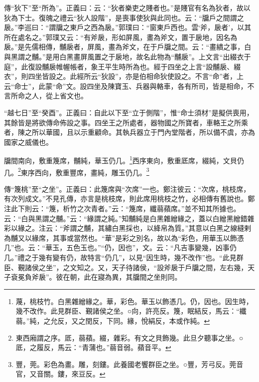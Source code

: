 {\noindent\zhuan{}\fzbyks 傳“狄下”至“所為”。正義曰：云：“狄者樂吏之賤者也。”是賤官有名為狄者，故以狄為下士。復魄之禮云“狄人設階”，是喪事使狄與此同也。云：“牖戶之間謂之扆。”李巡曰：“謂牖之東戶之西為扆。”郭璞曰：“窗東戶西也。雲‘斧，扆者’，以其所在處名之。”郭璞又云：“有斧扆，形如屏風，畫為斧文，置于扆地，因名為扆。”是先儒相傳，黼扆者，屏風，畫為斧文，在于戶牖之間。云：“畫繢之事，白與黑謂之黼。”是用白黑畫屏風置之于扆地，故名此物為“黼扆”。上文言“出綴衣于庭”，此復設黼扆帷幄帳者，象王平生時所為也。經于四坐之上言“設黼扆、綴衣”，則四坐皆設之。此經所云“狄設”，亦是伯相命狄使設之。不言“命”者，上云“命士”，此蒙“命”文。設四坐及陳寶玉、兵器與輅車，各有所司，皆是相命，不言所命之人，從上省文也。 \par}

{\noindent\shu{}\fzkt “越七日”至“癸酉”。正義曰：自此以下至“立于側階”，惟“命士須材”是擬供喪用，其餘皆是將欲傳命佈設之事。四坐王之所處者，器物國之所寶者，車輅王之所乘者，陳之所以華國，且以示重顧命。其執兵器立于門內堂階者，所以備不虞，亦為國家之威儀也。 \par}

牖間南向，敷重篾席，黼純，華玉仍几。\footnote{蔑，桃枝竹。白黑雜繒緣之。華，彩色。華玉以飾憑几。仍，因也。因生時，幾不改作。此見群臣、覲諸侯之坐。○向，許亮反。篾，眠結反，馬云：“纖蒻。”純，之允反，又之閏反，下同。緣，悅絹反，本或作純。}西序東向，敷重厎席，綴純，文貝仍几。\footnote{東西廂謂之序。厎，蒻蘋。綴，雜彩。有文之貝飾幾。此旦夕聽事之坐。○厎，之履反，馬云：“青蒲也。”蒻音弱。蘋音平。}東序西向，敷重豐席，畫純，雕玉仍几。\footnote{豐，莞。彩色為畫。雕，刻鏤。此養國老饗群臣之坐。○豐，芳弓反。莞音官，又音關。鏤，來豆反。}


{\noindent\zhuan{}\fzbyks 傳“篾桃”至“之坐”。正義曰：此篾席與“次席”一也。鄭注彼云：“次席，桃枝席，有次列成文。”不見孔傳，亦言是桃枝席，則此席用桃枝之竹，必相傳有舊說也。鄭注此下則云：“篾，析竹之次青者。”云：“篾席，纖蒻蘋席。”並不知其所據也。云：“白與黑謂之黼。”云：“緣謂之純。”知黼純是白黑雜繒緣之，蓋以白繒黑繒錯雜彩以緣之。注云：“斧謂之黼，其繡白黑採也，以絳帛為質。”其意以白黑之線縫剌為黼又以緣席，其事或當然也。“華”是彩之別名，故以為“彩色，用華玉以飾憑几”也。云：“華玉，五色玉也。”“仍，因也”，文。云：“凡吉事變幾，凶事仍几。”禮之于幾有變有仍，故特言“仍几”，以見“因生時，幾不改作”也。“此見群臣、覲諸侯之坐”，之文知之。又，天子待諸侯，“設斧扆于戶牖之間，左右幾，天子袞冕負斧扆”。彼在朝，此在寢為異，其牖間之坐則同。 \par}

